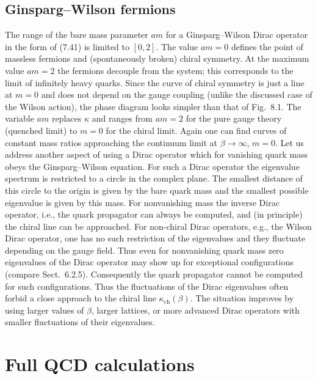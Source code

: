 \subsection{Ginsparg--Wilson fermions}

The range of the bare mass parameter $am$ for a Ginsparg--Wilson Dirac operator
in the form of (7.41) is limited to $[0, 2]$. The value $am = 0$ defines the
point of massless fermions and (spontaneously broken) chiral symmetry. At the
maximum value $am = 2$ the fermions decouple from the system; this corresponds
to the limit of infinitely heavy quarks.
Since the curve of chiral symmetry is just a line at $m = 0$ and does not depend
on the gauge coupling (unlike the discussed case of the Wilson action), the
phase diagram looks simpler than that of Fig.~8.1. The variable $am$ replaces
$\kappa$ and ranges from $am = 2$ for the pure gauge theory (quenched limit) to
$m = 0$ for the chiral limit. Again one can find curves of constant mass ratios
approaching the continuum limit at $\beta \to \infty$, $m = 0$.
Let us address another aspect of using a Dirac operator which for vanishing
quark mass obeys the Ginsparg--Wilson equation. For such a Dirac operator the
eigenvalue spectrum is restricted to a circle in the complex plane. The
smallest distance of this circle to the origin is given by the bare quark mass
and the smallest possible eigenvalue is given by this mass. For nonvanishing
mass the inverse Dirac operator, i.e., the quark propagator can always be
computed, and (in principle) the chiral line can be approached.
For non-chiral Dirac operators, e.g., the Wilson Dirac operator, one has no such
restriction of the eigenvalues and they fluctuate depending on the gauge field.
Thus even for nonvanishing quark mass zero eigenvalues of the Dirac operator may
show up for exceptional configurations (compare Sect.~6.2.5). Consequently the
quark propagator cannot be computed for such configurations. Thus the
fluctuations of the Dirac eigenvalues often forbid a close approach to the
chiral line $\kappa_{\mathrm{ch}}(\beta)$. The situation improves by using
larger values of $\beta$, larger lattices, or more advanced Dirac operators
with smaller fluctuations of their eigenvalues.

\section{Full QCD calculations}

